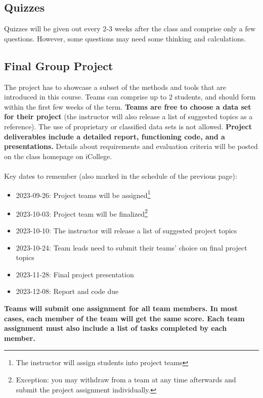 \documentclass{article}
\begin{document}
\subsection{Quizzes}
Quizzes will be given out every 2-3 weeks after the class and comprise only a few questions. However, some questions may need some thinking and calculations.


\subsection{Final Group Project}
The project has to showcase a subset of the methods and tools that are introduced in this course. Teams can comprise up to 2 students, and should form within the ﬁrst few weeks of the term. \textbf{Teams are free to choose a data set for their project} (the instructor will also release a list of suggested topics as a reference). The use of proprietary or classiﬁed data sets is not allowed. \textbf{Project deliverables include a detailed report, functioning code, and a presentations.} Details about requirements and evaluation criteria will be posted on the class homepage on iCollege.\\
\\
Key dates to remember (also marked in the schedule of the previous page):\\
\begin{itemize}
	\item 2023-09-26: Project teams will be assigned\footnote{The instructor will assign students into project teams}
	\item 2023-10-03: Project team will be finalized\footnote{Exception: you may withdraw from a team at any time afterwards and submit the project assignment individually.}
	\item 2023-10-10: The instructor will release a list of suggested project topics
	\item 2023-10-24: Team leads need to submit their teams' choice on final project topics
	\item 2023-11-28: Final project presentation
	\item 2023-12-08: Report and code due
\end{itemize}

\begin{flushleft}
	\textbf{Teams will submit one assignment for all team members. In most cases, each member of the team will get the same score. Each team assignment must also include a list of tasks completed by each member.}
\end{flushleft}
\end{document}
